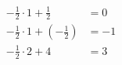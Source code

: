 \documentclass[preview]{standalone}
\begin{document}
\begin{align*}
- \frac{1}{2}\cdot1 + \frac{1}{2} & = 0 \\ -\frac{1}{2}\cdot1 + (-\frac{1}{2}) & = -1 \\ - \frac{1}{2}\cdot2 + 4  & = 3 \\
\end{align*}
\end{document}
